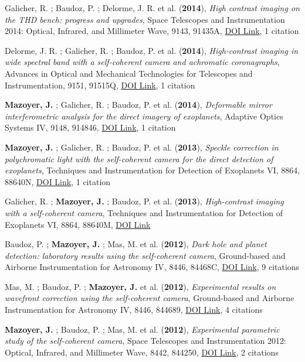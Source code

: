\documentclass[11pt]{article}
\begin{document}
\begin{etaremune}
\item Galicher, R. ; Baudoz, P. ; Delorme, J. R. et al. ({\bf2014}), {\it High contrast imaging on the THD bench: progress and upgrades}, Space Telescopes and Instrumentation 2014: Optical, Infrared, and Millimeter Wave, 9143, 91435A, \href{https://doi.org/10.1117/12.2055902}{DOI Link}, 1 citation

\item Delorme, J. R. ; Galicher, R. ; Baudoz, P. et al. ({\bf2014}), {\it High-contrast imaging in wide spectral band with a self-coherent camera and achromatic coronagraphs}, Advances in Optical and Mechanical Technologies for Telescopes and Instrumentation, 9151, 91515Q, \href{https://doi.org/10.1117/12.2056846}{DOI Link}, 1 citation

\item {\bf Mazoyer, J.} ; Galicher, R. ; Baudoz, P. et al. ({\bf2014}), {\it Deformable mirror interferometric analysis for the direct imagery of exoplanets}, Adaptive Optics Systems IV, 9148, 914846, \href{https://doi.org/10.1117/12.2057833}{DOI Link}, 1 citation

\item {\bf Mazoyer, J.} ; Galicher, R. ; Baudoz, P. et al. ({\bf2013}), {\it Speckle correction in polychromatic light with the self-coherent camera for the direct detection of exoplanets}, Techniques and Instrumentation for Detection of Exoplanets VI, 8864, 88640N, \href{https://doi.org/10.1117/12.2023508}{DOI Link}, 1 citation

\item Galicher, R. ; {\bf Mazoyer, J.} ; Baudoz, P. et al. ({\bf2013}), {\it High-contrast imaging with a self-coherent camera}, Techniques and Instrumentation for Detection of Exoplanets VI, 8864, 88640M, \href{https://doi.org/10.1117/12.2025298}{DOI Link}

\item Baudoz, P. ; {\bf Mazoyer, J.} ; Mas, M. et al. ({\bf2012}), {\it Dark hole and planet detection: laboratory results using the self-coherent camera}, Ground-based and Airborne Instrumentation for Astronomy IV, 8446, 84468C, \href{https://doi.org/10.1117/12.926575}{DOI Link}, 9 citations

\item Mas, M. ; Baudoz, P. ; {\bf Mazoyer, J.} et al. ({\bf2012}), {\it Experimental results on wavefront correction using the self-coherent camera}, Ground-based and Airborne Instrumentation for Astronomy IV, 8446, 844689, \href{https://doi.org/10.1117/12.926586}{DOI Link}, 4 citations

\item {\bf Mazoyer, J.} ; Baudoz, P. ; Mas, M. et al. ({\bf2012}), {\it Experimental parametric study of the self-coherent camera}, Space Telescopes and Instrumentation 2012: Optical, Infrared, and Millimeter Wave, 8442, 844250, \href{https://doi.org/10.1117/12.926080}{DOI Link}, 2 citations

\end{etaremune}
\end{document}
